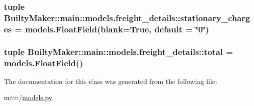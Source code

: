 \hypertarget{classBuiltyMaker_1_1main_1_1models_1_1freight__details_a653f7f79d75ad62d9ddedf7fc2311aa8}{
\subsubsection[{stationary\-\_\-charges}]{\setlength{\rightskip}{0pt plus 5cm}tuple {\bf \-Builty\-Maker\-::main\-::models.\-freight\-\_\-details\-::stationary\-\_\-charges} = models.\-Float\-Field(blank=\-True, default = \char`\"{}0\char`\"{})}}\label{classBuiltyMaker_1_1main_1_1models_1_1freight__details_a653f7f79d75ad62d9ddedf7fc2311aa8}
\hypertarget{classBuiltyMaker_1_1main_1_1models_1_1freight__details_a49f778391bbd1930168549bc66befc7c}{
\subsubsection[{total}]{\setlength{\rightskip}{0pt plus 5cm}tuple {\bf \-Builty\-Maker\-::main\-::models.\-freight\-\_\-details\-::total} = models.\-Float\-Field()}}\label{classBuiltyMaker_1_1main_1_1models_1_1freight__details_a49f778391bbd1930168549bc66befc7c}


\-The documentation for this class was generated from the following file\-:\begin{DoxyCompactItemize}
\item 
main/\hyperlink{models_8py}{models.\-py}\end{DoxyCompactItemize}

